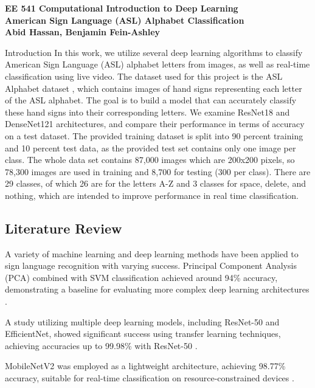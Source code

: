 \documentclass[12pt, a4paper]{article}
\newcommand{\coursename}{EE 541 Computational Introduction to Deep Learning}
\newcommand{\doctitle}{American Sign Language (ASL) Alphabet Classification}
\newcommand{\name}{Abid Hassan, Benjamin Fein-Ashley}
\begin{document}
\begin{center}
\small
\textbf{\coursename} \\
\Large
\bfseries
\doctitle \\
\vspace{0.8cm}
\small
{\normalfont\small \name}
\end{center}

\thispagestyle{plain}

\noindent

\newpage

\begin{section}{Introduction}
    In this work, we utilize several deep learning algorithms to classify American Sign Language (ASL) alphabet letters from images, as well as real-time classification using live video. The dataset used for this project is the ASL Alphabet dataset \cite{kaggle2022aslalphabet}, which contains images of hand signs representing each letter of the ASL alphabet. The goal is to build a model that can accurately classify these hand signs into their corresponding letters.
    We examine ResNet18 and DenseNet121 architectures, and compare their performance in terms of accuracy on a test dataset. The provided training dataset is split into 90 percent training and 10 percent test data, as the provided test set contains only one image per class. The whole data set contains 87,000 images which are 200x200 pixels, so 78,300 images are used in training and 8,700 for testing (300 per class). There are 29 classes, of which 26 are for the letters A-Z and 3 classes for space, delete, and nothing, which are intended to improve performance in real time classification.
    
    \subsection{Literature Review}
    A variety of machine learning and deep learning methods have been applied to sign language recognition with varying success.
    Principal Component Analysis (PCA) combined with SVM classification achieved around 94\% accuracy, demonstrating a baseline for evaluating more complex deep learning architectures \cite{mdpi2023resnet}.
    
    A study utilizing multiple deep learning models, including ResNet-50 and EfficientNet, showed significant success using transfer learning techniques, achieving accuracies up to 99.98\% with ResNet-50 \cite{mdpi2023resnet}.
    
    MobileNetV2 was employed as a lightweight architecture, achieving 98.77\% accuracy, suitable for real-time classification on resource-constrained devices \cite{techscience2022mobilenet}.
    

\end{section}
\end{document}
